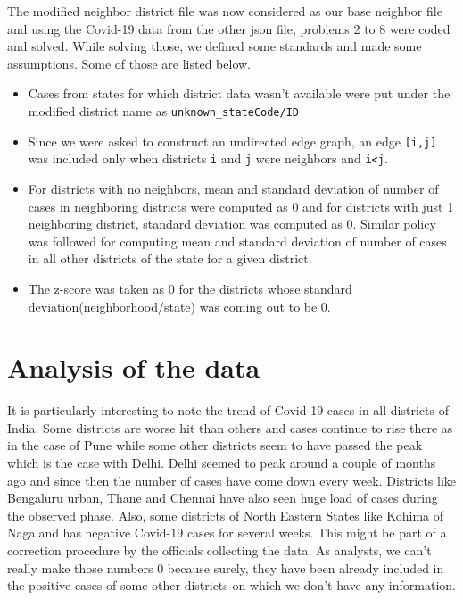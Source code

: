 \documentclass[letterpaper,12pt]{article}
\begin{document}
The modified neighbor district file was now considered as our base neighbor file and using the Covid-19 data from the other json file, problems 2 to 8 were coded and solved. While solving those, we defined some standards and made some assumptions. Some of those are listed below. 
\begin{itemize}
    \item Cases from states for which district data wasn't available were put under the modified district name as \verb|unknown_stateCode/ID|   
    \item Since we were asked to construct an undirected edge graph, an edge \verb|[i,j]| was included only when districts \verb|i| and \verb|j| were neighbors and \verb|i<j|.
    \item For districts with no neighbors, mean and standard deviation of number of cases in neighboring districts were computed as 0 and for districts with just 1 neighboring district, standard deviation was computed as 0. Similar policy was followed for computing mean and standard deviation of number of cases in all other districts of the state for a given district.
    \item The z-score was taken as 0 for the districts whose standard deviation(neighborhood/state) was coming out to be 0. 
\end{itemize}


\section{Analysis of the data}

It is particularly interesting to note the trend of Covid-19 cases in all districts of India. Some districts are worse hit than others and cases continue to rise there as in the case of Pune while some other districts seem to have passed the peak which is the case with Delhi. Delhi seemed to peak around a couple of months ago and since then the number of cases have come down every week. Districts like Bengaluru urban, Thane and Chennai have also seen huge load of cases during the observed phase. Also, some districts of North Eastern States like Kohima of Nagaland has negative Covid-19 cases for several weeks. This might be part of a correction procedure by the officials collecting the data. As analysts, we can't really make those numbers 0 because surely, they have been already included in the positive cases of some other districts on which we don't have any information.
\end{document}
